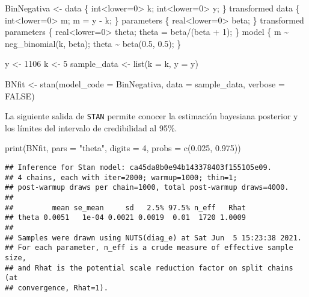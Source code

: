 \documentclass[
  spanish,
]{book}
\newenvironment{Shaded}{\begin{snugshade}}{\end{snugshade}}
\newcommand{\AttributeTok}[1]{\textcolor[rgb]{0.77,0.63,0.00}{#1}}
\newcommand{\ConstantTok}[1]{\textcolor[rgb]{0.00,0.00,0.00}{#1}}
\newcommand{\DecValTok}[1]{\textcolor[rgb]{0.00,0.00,0.81}{#1}}
\newcommand{\FloatTok}[1]{\textcolor[rgb]{0.00,0.00,0.81}{#1}}
\newcommand{\FunctionTok}[1]{\textcolor[rgb]{0.00,0.00,0.00}{#1}}
\newcommand{\NormalTok}[1]{#1}
\newcommand{\OtherTok}[1]{\textcolor[rgb]{0.56,0.35,0.01}{#1}}
\newcommand{\StringTok}[1]{\textcolor[rgb]{0.31,0.60,0.02}{#1}}
\theoremstyle{definition}
\theoremstyle{definition}
\theoremstyle{definition}
\theoremstyle{definition}
\theoremstyle{remark}
\begin{document}
\begin{Shaded}
\begin{Highlighting}[]
\NormalTok{BinNegativa }\OtherTok{\textless{}{-}} \StringTok{\textquotesingle{}data \{}
\StringTok{  int\textless{}lower=0\textgreater{} k;}
\StringTok{  int\textless{}lower=0\textgreater{} y;}
\StringTok{\}}
\StringTok{transformed data \{}
\StringTok{  int\textless{}lower=0\textgreater{} m;}
\StringTok{  m = y {-} k;}
\StringTok{\}}
\StringTok{parameters \{}
\StringTok{  real\textless{}lower=0\textgreater{} beta;}
\StringTok{\}}
\StringTok{transformed parameters \{}
\StringTok{  real\textless{}lower=0\textgreater{} theta;}
\StringTok{  theta = beta/(beta + 1);}
\StringTok{\}}
\StringTok{model \{}
\StringTok{  m \textasciitilde{} neg\_binomial(k, beta);}
\StringTok{  theta \textasciitilde{} beta(0.5, 0.5);}
\StringTok{\}}
\StringTok{\textquotesingle{}}

\NormalTok{y }\OtherTok{\textless{}{-}} \DecValTok{1106}
\NormalTok{k }\OtherTok{\textless{}{-}} \DecValTok{5}
\NormalTok{sample\_data }\OtherTok{\textless{}{-}} \FunctionTok{list}\NormalTok{(}\AttributeTok{k =}\NormalTok{ k, }\AttributeTok{y =}\NormalTok{ y)}

\NormalTok{BNfit }\OtherTok{\textless{}{-}} \FunctionTok{stan}\NormalTok{(}\AttributeTok{model\_code =}\NormalTok{ BinNegativa,}
              \AttributeTok{data =}\NormalTok{ sample\_data, }\AttributeTok{verbose =} \ConstantTok{FALSE}\NormalTok{)}
\end{Highlighting}
\end{Shaded}

La siguiente salida de \texttt{STAN} permite conocer la estimación bayesiana posterior y los límites del intervalo de credibilidad al 95\%.

\begin{Shaded}
\begin{Highlighting}[]
\FunctionTok{print}\NormalTok{(BNfit, }\AttributeTok{pars =} \StringTok{"theta"}\NormalTok{, }
      \AttributeTok{digits =} \DecValTok{4}\NormalTok{, }\AttributeTok{probs =} \FunctionTok{c}\NormalTok{(}\FloatTok{0.025}\NormalTok{, }\FloatTok{0.975}\NormalTok{))}
\end{Highlighting}
\end{Shaded}

\begin{verbatim}
## Inference for Stan model: ca45da8b0e94b143378403f155105e09.
## 4 chains, each with iter=2000; warmup=1000; thin=1; 
## post-warmup draws per chain=1000, total post-warmup draws=4000.
## 
##         mean se_mean     sd   2.5% 97.5% n_eff   Rhat
## theta 0.0051   1e-04 0.0021 0.0019  0.01  1720 1.0009
## 
## Samples were drawn using NUTS(diag_e) at Sat Jun  5 15:23:38 2021.
## For each parameter, n_eff is a crude measure of effective sample size,
## and Rhat is the potential scale reduction factor on split chains (at 
## convergence, Rhat=1).
\end{verbatim}
\end{document}
